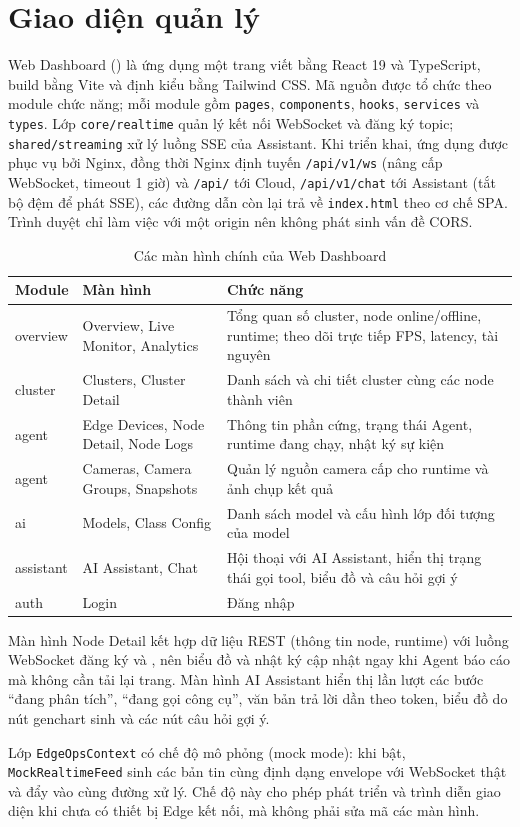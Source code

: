 \section{Giao diện quản lý}

Web Dashboard () là ứng dụng một trang viết bằng React 19
và TypeScript, build bằng Vite và định kiểu bằng Tailwind CSS. Mã nguồn được tổ
chức theo module chức năng; mỗi module gồm \texttt{pages}, \texttt{components},
\texttt{hooks}, \texttt{services} và \texttt{types}. Lớp \texttt{core/realtime} quản
lý kết nối WebSocket và đăng ký topic; \texttt{shared/streaming} xử lý luồng SSE
của Assistant. Khi triển khai, ứng dụng được phục vụ bởi Nginx, đồng thời Nginx
định tuyến \texttt{/api/v1/ws} (nâng cấp WebSocket, timeout 1 giờ) và
\texttt{/api/} tới Cloud, \texttt{/api/v1/chat} tới Assistant (tắt bộ đệm để
phát SSE), các đường dẫn còn lại trả về \texttt{index.html} theo cơ chế SPA. Trình
duyệt chỉ làm việc với một origin nên không phát sinh vấn đề CORS.

\begin{table}[H]
\centering
\caption{Các màn hình chính của Web Dashboard}
\label{tab:dashboard-pages}
\begin{tabularx}{\textwidth}{L{3cm}L{4.4cm}Y}
\toprule
\textbf{Module} & \textbf{Màn hình} & \textbf{Chức năng}\\
\midrule
overview & Overview, Live Monitor, Analytics & Tổng quan số cluster, node online/offline, runtime; theo dõi trực tiếp FPS, latency, tài nguyên\\
cluster & Clusters, Cluster Detail & Danh sách và chi tiết cluster cùng các node thành viên\\
agent & Edge Devices, Node Detail, Node Logs & Thông tin phần cứng, trạng thái Agent, runtime đang chạy, nhật ký sự kiện\\
agent & Cameras, Camera Groups, Snapshots & Quản lý nguồn camera cấp cho runtime và ảnh chụp kết quả\\
ai & Models, Class Config & Danh sách model và cấu hình lớp đối tượng của model\\
assistant & AI Assistant, Chat & Hội thoại với AI Assistant, hiển thị trạng thái gọi tool, biểu đồ và câu hỏi gợi ý\\
auth & Login & Đăng nhập\\
\bottomrule
\end{tabularx}
\end{table}

Màn hình Node Detail kết hợp dữ liệu REST (thông tin node, runtime) với luồng
WebSocket đăng ký  và
, nên biểu đồ và nhật ký cập nhật ngay khi Agent
báo cáo mà không cần tải lại trang. Màn hình AI Assistant hiển thị lần lượt các
bước ``đang phân tích'', ``đang gọi công cụ'', văn bản trả lời dần theo token, biểu
đồ do nút genchart sinh và các nút câu hỏi gợi ý.

Lớp \texttt{EdgeOpsContext} có chế độ mô phỏng (mock mode): khi bật,
\texttt{MockRealtimeFeed} sinh các bản tin cùng định dạng envelope với WebSocket
thật và đẩy vào cùng đường xử lý. Chế độ này cho phép phát triển và trình diễn
giao diện khi chưa có thiết bị Edge kết nối, mà không phải sửa mã các màn hình.
